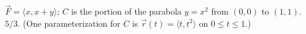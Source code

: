 {$\vec F = \langle x,x+y\rangle$; $C$ is the portion of the parabola $y=x^2$ from $(0,0)$ to $(1,1)$.
}
{$5/3$. (One parameterization for $C$ is $\vec r(t) = \langle t,t^2\rangle$ on $0\leq t\leq 1$.)
}
